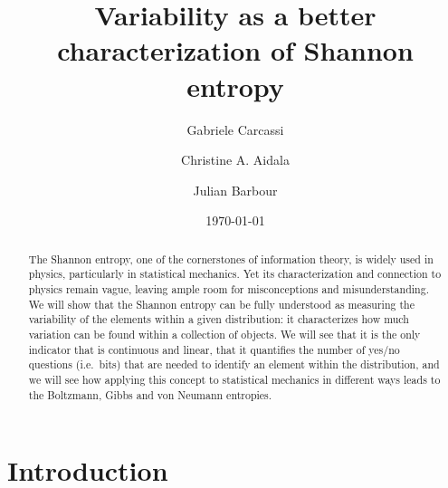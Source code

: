 \documentclass[iopart]{revtex4-1}
\begin{document}
\title{Variability as a better characterization of Shannon entropy}

\author{Gabriele Carcassi}
\author{Christine A. Aidala}

\author{Julian Barbour}

\date{\today}

\begin{abstract}
	The Shannon entropy, one of the cornerstones of information theory, is widely used in physics, particularly in statistical mechanics. Yet its characterization and connection to physics remain vague, leaving ample room for misconceptions and misunderstanding. We will show that the Shannon entropy can be fully understood as measuring the variability of the elements within a given distribution: it characterizes how much variation can be found within a collection of objects. We will see that it is the only indicator that is continuous and linear, that it quantifies the number of yes/no questions (i.e.~bits) that are needed to identify an element within the distribution, and we will see how applying this concept to statistical mechanics in different ways leads to the Boltzmann, Gibbs and von Neumann entropies.
\end{abstract}

\maketitle


\section{Introduction\label{int}}
\end{document}
